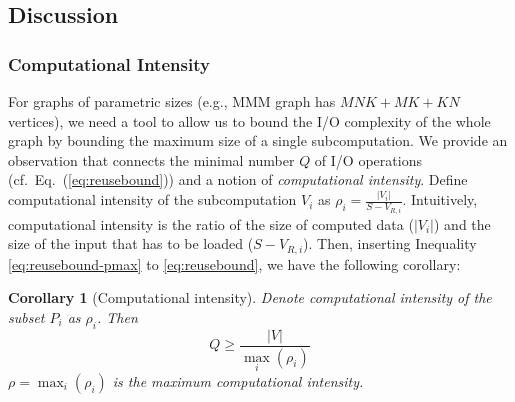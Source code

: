 \documentclass[sigplan,review,anonymous]{acmart}\settopmatter{printfolios=true,printccs=false,printacmref=false}
\newtheorem*{corollary*}{Corollary}
\newcommand\greg[1]{\textcolor{blue}{[Greg: #1]}}
\newcommand\mac[1]{\textcolor{red}{[Mac: #1]}}
\begin{document}
\subsection{Discussion}


\subsubsection{Computational Intensity}
%
For graphs of parametric sizes (e.g., MMM graph has $MNK + MK + KN$ vertices), 
we need a tool to allow us to bound the I/O complexity of the whole graph by 
bounding the maximum size of a single subcomputation. We provide an observation 
that connects the minimal 
number $Q$ of
I/O operations
(cf.~Eq.~(\ref{eq:reusebound})) and a notion
of \emph{computational intensity}.
%
Define computational intensity of the subcomputation $V_i$ as $\rho_i =
\frac{|V_i|}{S-V_{R,i}}$. Intuitively, computational intensity is the ratio of 
the size of computed data ($|V_i|$) and the size of the input that has to be 
loaded ($S-V_{R,i}$).
Then, inserting Inequality \ref{eq:reusebound-pmax} to \ref{eq:reusebound}, we 
have the following corollary:

\begin{corollary*}[Computational intensity]
\label{cor:q}
Denote computational intensity of the subset $P_i$ as $\rho_i$. Then
\begin{equation}
Q \ge \frac{|V|}{\max_i(\rho_i)}
\end{equation} 
$\rho = \max_i(\rho_i)$ is the \emph{maximum} computational intensity.
\end{corollary*}
\end{document}
